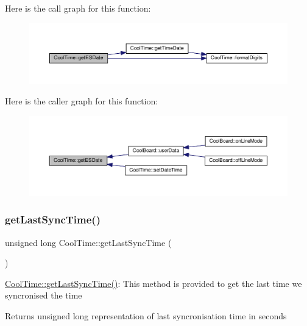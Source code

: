 Here is the call graph for this function\+:\nopagebreak
\begin{figure}[H]
\begin{center}
\leavevmode
\includegraphics[width=350pt]{class_cool_time_ac4f32ee513c1328d984306645e8785a4_cgraph}
\end{center}
\end{figure}
Here is the caller graph for this function\+:\nopagebreak
\begin{figure}[H]
\begin{center}
\leavevmode
\includegraphics[width=350pt]{class_cool_time_ac4f32ee513c1328d984306645e8785a4_icgraph}
\end{center}
\end{figure}
\mbox{\label{class_cool_time_a5d17f707a9d337720493b2bce9d41c21}} 
\subsubsection{\texorpdfstring{get\+Last\+Sync\+Time()}{getLastSyncTime()}}
{\footnotesize\ttfamily unsigned long Cool\+Time\+::get\+Last\+Sync\+Time (\begin{DoxyParamCaption}{ }\end{DoxyParamCaption})}

\hyperlink{class_cool_time_a5d17f707a9d337720493b2bce9d41c21}{Cool\+Time\+::get\+Last\+Sync\+Time()}\+: This method is provided to get the last time we syncronised the time

\begin{DoxyReturn}{Returns}
unsigned long representation of last syncronisation time in seconds 
\end{DoxyReturn}


